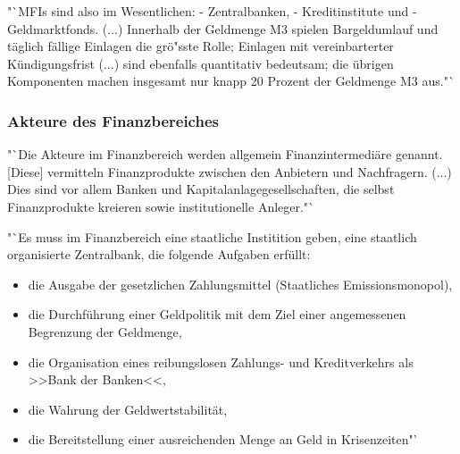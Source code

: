 \documentclass[
        onecolumn,
        a4paper,
        abstracton,
        parskip=half
        ,final
        ]{scrartcl}
\begin{document}
    \citep[vgl.][S.508]{Basseler2010} "`MFIs sind also im Wesentlichen:
    - Zentralbanken,
    - Kreditinstitute und
    - Geldmarktfonds.
    (...) Innerhalb der Geldmenge M3 spielen Bargeldumlauf und t{\"a}glich f{\"a}llige Einlagen die gr{\"o}{"ss}te Rolle; Einlagen mit vereinbarterter K{\"u}ndigungsfrist (...) sind ebenfalls quantitativ bedeutsam; die {\"u}brigen Komponenten machen insgesamt nur knapp 20 Prozent der Geldmenge M3 aus."`


    \subsubsection{ Akteure des Finanzbereiches}
    \citep[vgl.][S.511f]{Basseler2010} "`Die Akteure im Finanzbereich werden allgemein Finanzintermedi{\"a}re genannt. [Diese] vermitteln Finanzprodukte zwischen den Anbietern und Nachfragern. (...) Dies sind vor allem Banken und Kapitalanlagegesellschaften, die selbst Finanzprodukte kreieren sowie institutionelle Anleger."`

     "`Es muss im Finanzbereich eine staatliche Institition geben, eine staatlich organisierte Zentralbank, die folgende Aufgaben erf{\"u}llt:
     \begin{itemize}
    \item{die Ausgabe der gesetzlichen Zahlungsmittel (Staatliches Emissionsmonopol),}
    \item{die Durchf{\"u}hrung einer Geldpolitik mit dem Ziel einer angemessenen Begrenzung der Geldmenge,}
    \item{die Organisation eines reibungslosen Zahlungs- und Kreditverkehrs als >>Bank der Banken<<,}
    \item{die Wahrung der Geldwertstabilit{\"a}t,}
    \item{die Bereitstellung einer ausreichenden Menge an Geld in Krisenzeiten"'}
    \end{itemize}
\end{document}
